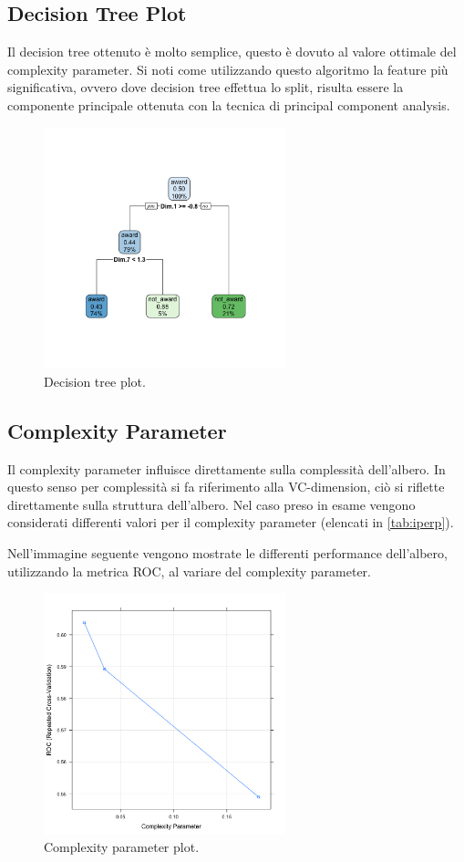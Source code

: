 \subsection{Decision Tree Plot}
Il decision tree ottenuto è molto semplice, questo è dovuto al valore
ottimale del complexity parameter. Si noti come utilizzando questo algoritmo
la feature più significativa, ovvero dove decision tree effettua lo split, risulta
essere la componente principale ottenuta con la tecnica di principal
component analysis.


\begin{figure}[H]
	\centering
	\includegraphics[width=7cm,trim={2.5cm 2.5cm 2.5cm 2.5cm}, clip]{../images/rpart_plot.png}
	\caption{Decision tree plot.}
	\label{fig:decision_tree_plot}
\end{figure}

\subsection{Complexity Parameter}
Il complexity parameter influisce direttamente sulla complessità
dell'albero. In questo senso per complessità si fa riferimento alla
VC-dimension, ciò si riflette direttamente sulla struttura
dell'albero. Nel caso preso in esame vengono considerati differenti
valori per il complexity parameter (elencati in \autoref{tab:iperp}).

Nell'immagine seguente vengono mostrate le differenti performance
dell'albero, utilizzando la metrica ROC, al variare del complexity
parameter.

\begin{figure}[H]
	\centering
	\includegraphics[width=7cm]{../images/rpart_cp_plot.png}
	\caption{Complexity parameter plot.}
	\label{fig:cp_plot}
\end{figure}

